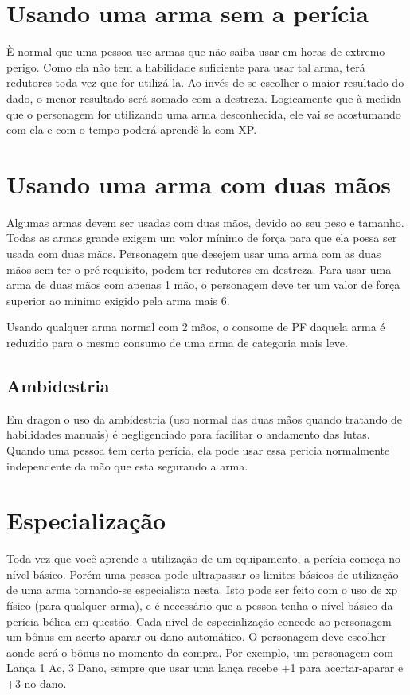 \section{Usando uma arma sem a perícia}

È normal que uma pessoa use armas que não saiba usar em horas de extremo perigo. Como ela não tem a habilidade suficiente para usar tal arma, terá redutores toda vez que for utilizá-la. Ao invés de se escolher o maior resultado do dado, o menor resultado será somado com a destreza. Logicamente que à medida que o personagem for utilizando uma arma desconhecida, ele vai se acostumando com ela e com o tempo poderá aprendê-la com XP.

\section{Usando uma arma com duas mãos}

Algumas armas devem ser usadas com duas mãos, devido ao seu peso e tamanho. Todas as armas grande exigem um valor mínimo de força para que ela possa ser usada com duas mãos. Personagem que desejem usar uma arma com as duas mãos sem ter o pré-requisito, podem ter redutores em destreza. Para usar uma arma de duas mãos com apenas 1 mão, o personagem deve ter um valor de força superior ao mínimo exigido pela arma mais 6.

Usando qualquer arma normal com 2 mãos, o consome de PF daquela arma é reduzido para o mesmo consumo de uma arma de categoria mais leve.



\subsection{Ambidestria}

Em dragon o uso da ambidestria (uso normal das duas mãos quando tratando de habilidades manuais) é negligenciado para facilitar o andamento das lutas. Quando uma pessoa tem certa perícia, ela pode usar essa pericia normalmente independente da mão que esta segurando a arma.

\section{Especialização}

Toda vez que você aprende a utilização de um equipamento, a perícia começa no nível básico. Porém uma pessoa pode ultrapassar os limites básicos de utilização de uma arma tornando-se especialista nesta. Isto pode ser feito com o uso de xp físico (para qualquer arma), e é necessário que a pessoa tenha o nível básico da perícia bélica em questão. Cada nível de especialização concede ao personagem um bônus em acerto-aparar ou dano automático. O personagem deve escolher aonde será o bônus no momento da compra. Por exemplo, um personagem com Lança 1 Ac, 3 Dano, sempre que usar uma lança recebe +1 para acertar-aparar e +3 no dano.  

